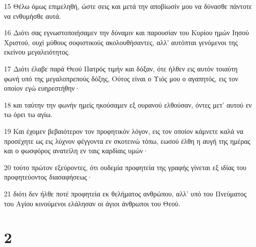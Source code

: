 \par 15 Θέλω όμως επιμεληθή, ώστε σεις και μετά την αποβίωσίν μου να δύνασθε πάντοτε να ενθυμήσθε αυτά.
\par 16 Διότι σας εγνωστοποιήσαμεν την δύναμιν και παρουσίαν του Κυρίου ημών Ιησού Χριστού, ουχί μύθους σοφιστικούς ακολουθήσαντες, αλλ' αυτόπται γενόμενοι της εκείνου μεγαλειότητος.
\par 17 Διότι έλαβε παρά Θεού Πατρός τιμήν και δόξαν, ότε ήλθεν εις αυτόν τοιαύτη φωνή υπό της μεγαλοπρεπούς δόξης, Ούτος είναι ο Υιός μου ο αγαπητός, εις τον οποίον εγώ ευηρεστήθην·
\par 18 και ταύτην την φωνήν ημείς ηκούσαμεν εξ ουρανού ελθούσαν, όντες μετ' αυτού εν τω όρει τω αγίω.
\par 19 Και έχομεν βεβαιότερον τον προφητικόν λόγον, εις τον οποίον κάμνετε καλά να προσέχητε ως εις λύχνον φέγγοντα εν σκοτεινώ τόπω, εωσού έλθη η αυγή της ημέρας και ο φωσφόρος ανατείλη εν ταις καρδίαις υμών·
\par 20 τούτο πρώτον εξεύροντες, ότι ουδεμία προφητεία της γραφής γίνεται εξ ιδίας του προφητεύοντος διασαφήσεως·
\par 21 διότι δεν ήλθε ποτέ προφητεία εκ θελήματος ανθρώπου, αλλ' υπό του Πνεύματος του Αγίου κινούμενοι ελάλησαν οι άγιοι άνθρωποι του Θεού.

\chapter{2}

